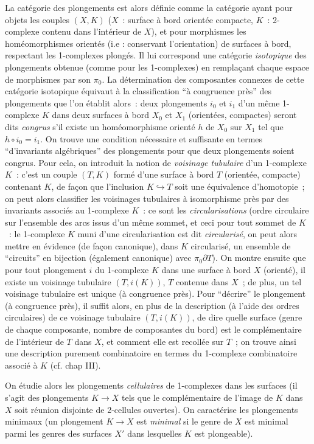 La catégorie des plongements est alors définie comme la catégorie ayant pour objets les couples $(X, K)$ ($X$~: surface à bord orientée compacte, $K$~: 2-complexe contenu dans l'intérieur de $X$), et pour morphismes les homéomorphismes orientés (i.e : conservant l'orientation) de surfaces à bord, respectant les 1-complexes plongés. Il lui correspond une catégorie \emph{isotopique} des plongements obtenue (comme pour les 1-complexes) en remplaçant chaque espace de morphismes par son $\pi_0$. La détermination des composantes connexes de cette catégorie isotopique équivaut à la classification ``à congruence près'' des plongements que l'on établit alors~: deux plongements $i_0$ et $i_1$ d'un même 1-complexe $K$ dans deux surfaces à bord $X_0$ et $X_1$ (orientées, compactes) seront dits \emph{congrus} s'il existe un homéomorphisme orienté $h$ de $X_0$ sur $X_1$ tel que $h \circ i_0 = i_1$. On trouve une condition nécessaire et suffisante en termes ``d'invariants algébriques'' des plongements pour que deux plongements soient congrus. Pour cela, on introduit la notion de \emph{voisinage tubulaire} d'un 1-complexe $K$~: c'est un couple $(T,K)$ formé d'une surface à bord $T$ (orientée, compacte) contenant $K$, de façon que l'inclusion $K \hookrightarrow T$ soit une équivalence d'homotopie~; on peut alors classifier les voisinages tubulaires à isomorphisme près par des invariants associés au 1-complexe $K$~: ce sont les \emph{circularisations} (ordre circulaire sur l'ensemble des arcs issus d'un même sommet, et ceci pour tout sommet de $K$~: le 1-complexe $K$ muni d'une circularisation est dit \emph{circularisé}, on peut alors mettre en évidence (de façon canonique), dans $K$ circularisé, un ensemble de ``circuits'' en bijection (également canonique) avec $\pi_0 \partial T$). On montre ensuite que pour tout plongement $i$ du 1-complexe $K$ dans une surface à bord $X$ (orienté), il existe un voisinage tubulaire $(T, i(K))$, $T$ contenue dans $X$~; de plus, un tel voisinage tubulaire est unique (à congruence près). Pour ``décrire'' le plongement (à congruence près), il suffit alors, en plus de la description (à l'aide des ordres circulaires) de ce voisinage tubulaire $(T, i(K))$, de dire quelle surface (genre de chaque composante, nombre de composantes du bord) est le complémentaire de l'intérieur de $T$ dans $X$, et comment elle est recollée sur $T$~; on trouve ainsi une description purement combinatoire en termes du 1-complexe combinatoire associé à $K$ (cf. chap III).

On étudie alors les plongements \emph{cellulaires} de 1-complexes dans les surfaces (il s'agit des plongements $K \to X$ tels que le complémentaire de l'image de $K$ dans $X$ soit réunion disjointe de 2-cellules ouvertes). On caractérise les plongements minimaux (un plongement $K \to X$ est \emph{minimal} si le genre de $X$ est minimal parmi les genres des surfaces $X'$ dans lesquelles $K$ est plongeable).

